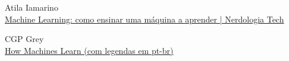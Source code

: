 \documentclass{article}
\begin{document}
        \begin{thebibliography}{2}
        Atila Iamarino
        \\
        \href{https://www.youtube.com/watch?v=mhe5e2B9bL8&t=1s}{Machine Learning: como ensinar uma máquina a aprender | Nerdologia Tech}
        
     
        CGP Grey \\
        \href{https://www.youtube.com/watch?v=R9OHn5ZF4Uo&t}{​How Machines Learn (com legendas em pt-br)}
     
     
        \end{thebibliography}
          

        
\end{document}
